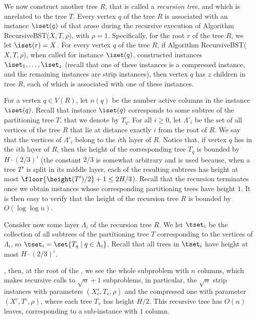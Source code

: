 We now construct another tree $R$, that is called a \emph{recursion tree}, and which is unrelated to the tree $T$. Every vertex $q$ of the tree $R$ is associated with an instance $\iset(q)$ of \minsat that arose during the recursive execution of Algorithm {\sc RecursiveBST}($X,T,\rho$), with $\rho=1$. 
Specifically, for the root $r$ of the tree $R$, we let $\iset(r)=X$. For every vertex $q$ of the tree $R$, if Algorithm  {\sc RecursiveBST}($X,T,\rho$), when called for instance $\iset(q)$, constructed instances $\iset_1,\ldots,\iset_z$ (recall that one of these instances is a compressed instance, and the remaining instances are strip instances), then vertex $q$ has $z$ children in tree $R$, each of which is associated with one of these instances.

For a vertex $q\in V(R)$, let $n(q)$ be the number active columns in the instance $\iset(q)$. 
Recall that instance $\iset(q)$ corresponds to some subtree of the partitioning tree $T$, that we denote by $T_q$. 
For all $i\geq 0$, let $\Lambda'_i$ be the set of all vertices of the tree $R$ that lie at distance exactly $i$ from the root of $R$. We say that the vertices of $\Lambda'_i$ belong to the $i$th layer of $R$. Notice that, if vertex $q$ lies in the $i$th layer of $R$, then the height of the corresponding tree $T_q$ is bounded by $H\cdot (2/3)^i$ (the constant $2/3$ is somewhat arbitrary and is used because, when a tree $T'$ is split in its middle layer, each of the resulting subtrees has height at most $\floor{\height(T')/2}+1\leq 2H/3$).
Recall that the recursion terminates once we obtain instances whose corresponding partitioning trees have height $1$. It is then easy to verify that the height of the recursion tree $R$ is bounded by $O(\log\log n)$.

%
%
%
%


Consider now some layer $\Lambda_i$ of the recursion tree $R$. We let $\tset_i$ be the collection of all subtrees of the partitioning tree $T$ corresponding to the vertices of $\Lambda_i$, so $\tset_i=\set{T_q\mid q\in \Lambda_i}$. Recall that all trees in $\tset_i$ have height at most $H\cdot (2/3)^i$.


\iffalse
, then, at the root of the , we see the whole subproblem with $n$ columns, which makes recursive calls to $\sqrt{n}+1$ subproblems, in particular, the $\sqrt{n}$ strip instances with parameters $(X^s_v, T_v, \rho)$ and the compressed one with parameter $(X^c, T^c, \rho)$, where each tree $T_v$ has height $H/2$.
This recursive tree has $O(n)$ leaves, corresponding to a sub-instance with $1$ column. 
 
